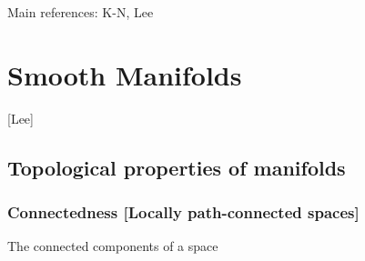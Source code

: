 \documentclass{report}
\theoremstyle{definition}
\begin{document}
Main references: K-N, Lee


\chapter{Smooth Manifolds}

[Lee]

\section{Topological properties of manifolds}

\subsection{Connectedness [Locally path-connected spaces]}

The connected components of a space
\end{document}

